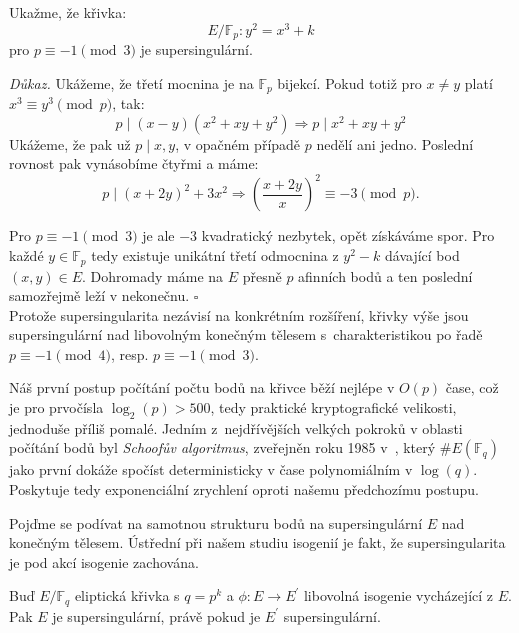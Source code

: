 \documentclass[12pt]{report}
\begin{document}
\begin{priklad}
Ukažme, že křivka:
 $$E/\mathbb{F}_p : y^2 = x^3 + k$$
pro $ p \equiv -1 \pmod{3}$ je supersingulární.
\end{priklad}
\noindent \textit{Důkaz.} Ukážeme, že třetí mocnina je na $\mathbb{F}_p$ bijekcí. Pokud totiž pro $x \neq y$ platí $x^3 \equiv y^3 \pmod{p}$, tak:
\begin{equation*}
p \mid (x-y)(x^2+xy+y^2) \Rightarrow p \mid x^2+xy+y^2 
\end{equation*}
Ukážeme, že pak už $p \mid x,y$, v opačném případě $p$ nedělí ani jedno. Poslední rovnost pak vynásobíme čtyřmi a máme:
\begin{equation*}
p \mid (x+2y)^2 + 3 x^2 \Rightarrow \left(\frac{x+2y}{x} \right)^2 \equiv -3 \pmod{p}.
\end{equation*}

Pro $p \equiv -1 \pmod{3}$ je ale $-3$ kvadratický nezbytek, opět získáváme spor. Pro každé $y \in \mathbb{F}_p$ tedy existuje unikátní třetí odmocnina z $y^2 - k$ dávající bod $(x,y) \in E$. Dohromady máme na $E$ přesně $p$ afinních bodů a ten poslední samozřejmě leží v nekonečnu. \hfill $\square$\\

Protože supersingularita nezávisí na konkrétním rozšíření, křivky výše jsou supersingulární nad libovolným konečným tělesem s~charakteristikou po řadě $p \equiv -1 \pmod{4}$, resp. $p \equiv -1 \pmod{3}$.

Náš první postup počítání počtu bodů na křivce běží nejlépe v $O(p)$ čase, což je pro prvočísla  $\log_2(p) > 500$, tedy praktické kryptografické velikosti, jednoduše příliš pomalé. Jedním z~nejdřívějších velkých pokroků v oblasti počítání bodů byl \textit{Schoofův algoritmus}, zveřejněn roku 1985 v~\cite{Schoof}, který $\# E(\mathbb{F}_q)$ jako první dokáže spočíst deterministicky v čase polynomiálním v $\log(q)$. Poskytuje tedy exponenciální zrychlení oproti našemu předchozímu postupu.

Pojďme se podívat na samotnou strukturu bodů na supersingulární $E$ nad konečným tělesem. Ústřední při našem studiu isogenií je fakt, že supersingularita je pod akcí isogenie zachována. 

\begin{veta}
Buď $E/\mathbb{F}_q$ eliptická křivka s $q = p^k$ a $\phi : E \longrightarrow E^\prime$ libovolná isogenie vycházející z $E$. Pak $E$ je supersingulární, právě pokud je $E^\prime$ supersingulární.
\end{veta}
\end{document}
